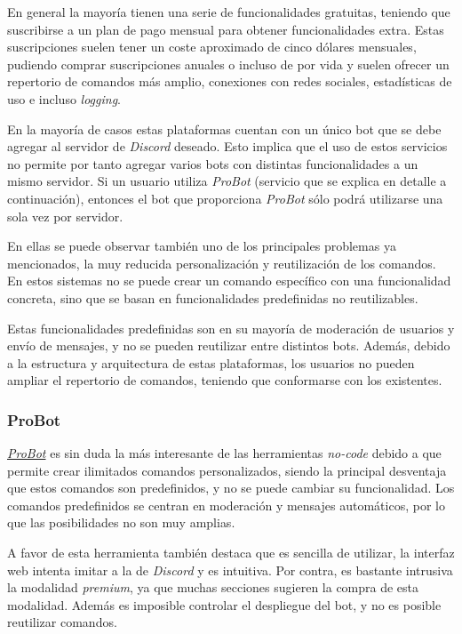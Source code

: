 En general la mayoría tienen una serie de funcionalidades gratuitas, teniendo que suscribirse a un plan de pago mensual para obtener funcionalidades extra. Estas suscripciones suelen tener un coste aproximado de cinco dólares mensuales, pudiendo comprar suscripciones anuales o incluso de por vida y suelen ofrecer un repertorio de comandos más amplio, conexiones con redes sociales, estadísticas de uso e incluso \textit{logging}.

En la mayoría de casos estas plataformas cuentan con un único bot que se debe agregar al servidor de \textit{Discord} deseado. Esto implica que el uso de estos servicios no permite por tanto agregar varios bots con distintas funcionalidades a un mismo servidor. Si un usuario utiliza \textit{ProBot} (servicio que se explica en detalle a continuación), entonces el bot que proporciona \textit{ProBot} sólo podrá utilizarse una sola vez por servidor.

En ellas se puede observar también uno de los principales problemas ya mencionados, la muy reducida personalización y reutilización de los comandos. En estos sistemas no se puede crear un comando específico con una funcionalidad concreta, sino que se basan en funcionalidades predefinidas no reutilizables.

Estas funcionalidades predefinidas son en su mayoría de moderación de usuarios y envío de mensajes, y no se pueden reutilizar entre distintos bots. Además, debido a la estructura y arquitectura de estas plataformas, los usuarios no pueden ampliar el repertorio de comandos, teniendo que conformarse con los existentes.

\subsubsection{ProBot}

\href{https://probot.io/}{\textit{ProBot}} es sin duda la más interesante de las herramientas \textit{no-code} debido a que permite crear ilimitados comandos personalizados, siendo la principal desventaja que estos comandos son predefinidos, y no se puede cambiar su funcionalidad. Los comandos predefinidos se centran en moderación y mensajes automáticos, por lo que las posibilidades no son muy amplias.

A favor de esta herramienta también destaca que es sencilla de utilizar, la interfaz web intenta imitar a la de \textit{Discord} y es intuitiva. Por contra, es bastante intrusiva la modalidad \textit{premium}, ya que muchas secciones sugieren la compra de esta modalidad. Además es imposible controlar el despliegue del bot, y no es posible reutilizar comandos.

